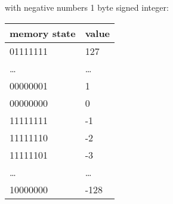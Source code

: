 with negative numbers \textrightarrow{} 1 byte signed integer:
\begin{center}
    \begin{tabular}{ l l }
        \toprule
        memory state & value  \\
        \midrule
        01111111     & 127    \\
        \ldots       & \ldots \\
        00000001     & 1      \\
        00000000     & 0      \\
        11111111     & -1     \\
        11111110     & -2     \\
        11111101     & -3     \\
        \ldots       & \ldots \\
        10000000     & -128   \\
        \bottomrule
    \end{tabular}
\end{center}


